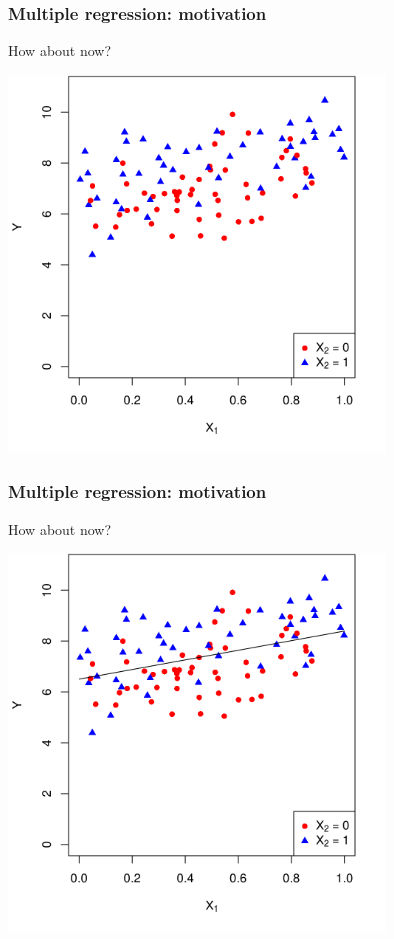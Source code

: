 \documentclass[12pt, 
hyperref={colorlinks=true, linkcolor=blue, urlcolor=cyan},dvipsnames]{beamer}
\begin{document}
\begin{frame}
\frametitle{Multiple regression: motivation}
How about now?

\centering
\includegraphics[width=0.75\textwidth]{plots/precision_colored.png}
\end{frame}

\begin{frame}
\frametitle{Multiple regression: motivation}
How about now?

\centering
\includegraphics[width=0.75\textwidth]{plots/precision_colored_with_line.png}
\end{frame}
\end{document}
